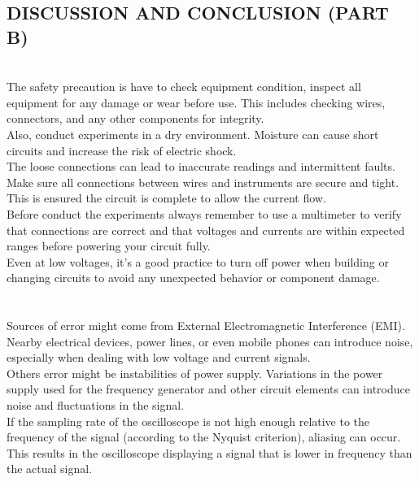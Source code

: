 \documentclass[twocolumn,a4paper,11pt]{article}
\begin{document}
\subsection*{DISCUSSION AND CONCLUSION (PART B)}
\\

The safety precaution is have to check equipment condition, inspect all equipment for any damage or wear before use. This includes checking wires, connectors, and any other components for integrity.\\

Also, conduct experiments in a dry environment. Moisture can cause short circuits and increase the risk of electric shock.\\

The loose connections can lead to inaccurate readings and intermittent faults. Make sure all connections between wires and instruments are secure and tight. This is ensured the circuit is complete to allow the current flow.\\

Before conduct the experiments always remember to use a multimeter to verify that connections are correct and that voltages and currents are within expected ranges before powering your circuit fully.\\

Even at low voltages, it's a good practice to turn off power when building or changing circuits to avoid any unexpected behavior or component damage.
\\
\\
 \\

Sources of error might come from External Electromagnetic Interference (EMI). Nearby electrical devices, power lines, or even mobile phones can introduce noise, especially when dealing with low voltage and current signals.\\

Others error might be instabilities of power supply. Variations in the power supply used for the frequency generator and other circuit elements can introduce noise and fluctuations in the signal.\\

If the sampling rate of the oscilloscope is not high enough relative to the frequency of the signal (according to the Nyquist criterion), aliasing can occur. This results in the oscilloscope displaying a signal that is lower in frequency than the actual signal.
\newpage
{}\\
\end{document}
